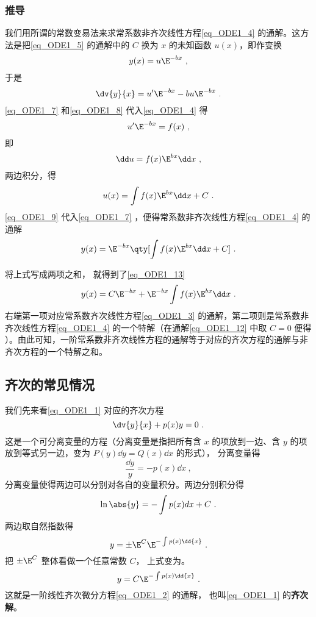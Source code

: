 \subsubsection{推导}
我们用所谓的常数变易法来求常系数非齐次线性方程\autoref{eq_ODE1_4} 的通解。这方法是把\autoref{eq_ODE1_5} 的通解中的 $C$ 换为 $x$ 的未知函数 $u(x)$，即作变换
\begin{equation}\label{eq_ODE1_7}
y(x)=u\E^{-bx}~,
\end{equation}
于是
\begin{equation}\label{eq_ODE1_8}
\dv{y}{x}=u'\E^{-bx}-bu\E^{-bx}~.
\end{equation}
\autoref{eq_ODE1_7} 和\autoref{eq_ODE1_8} 代入\autoref{eq_ODE1_4} 得
\begin{equation}
u'\E^{-bx}=f(x)~,
\end{equation}
即
\begin{equation}
\dd u=f(x)\E^{bx}\dd x~,
\end{equation}
两边积分，得
\begin{equation}\label{eq_ODE1_9}
u(x)=\int f(x)\E^{bx}\dd x+C~.
\end{equation}
\autoref{eq_ODE1_9} 代入\autoref{eq_ODE1_7} ，便得常系数非齐次线性方程\autoref{eq_ODE1_4} 的通解
\begin{equation}\label{eq_ODE1_12}
y(x)=\E^{-bx}\qty[\int f(x)\E^{bx}\dd x+C]~.
\end{equation}

将上式写成两项之和， 就得到了\autoref{eq_ODE1_13}
\begin{equation}
y(x)=C\E^{-bx}+\E^{-bx}\int f(x)\E^{bx}\dd x~.
\end{equation}
右端第一项对应常系数齐次线性方程\autoref{eq_ODE1_3} 的通解，第二项则是常系数非齐次线性方程\autoref{eq_ODE1_4} 的一个特解（在通解\autoref{eq_ODE1_12} 中取 $C=0$ 便得 ）。由此可知，一阶常系数非齐次线性方程的通解等于对应的齐次方程的通解与非齐次方程的一个特解之和。

\subsection{齐次的常见情况}
我们先来看\autoref{eq_ODE1_1} 对应的齐次方程
\begin{equation}\label{eq_ODE1_2}
\dv{y}{x} + p(x)y = 0~.
\end{equation}
这是一个可分离变量的方程（分离变量是指把所有含 $x$ 的项放到一边、含 $y$ 的项放到等式另一边，变为 $P(y) \dd y = Q(x) \dd x$ 的形式）， 分离变量得
\begin{equation}
\frac{\dd{y}}{y} = -p(x) \dd{x}~,
\end{equation}
分离变量使得两边可以分别对各自的变量积分。两边分别积分得
\begin{equation}
\ln\abs{y} = -\int p(x) dx + C~.
\end{equation}
两边取自然指数得
\begin{equation}
y = \pm \E^C \E^{-\int p(x) \dd{x}}~.
\end{equation}
把 $\pm \E^C $ 整体看做一个任意常数 $C$， 上式变为。
\begin{equation}\label{eq_ODE1_6}
y = C \E^{-\int p(x) \dd{x}}~.
\end{equation}
这就是一阶线性齐次微分方程\autoref{eq_ODE1_2} 的通解， 也叫\autoref{eq_ODE1_1} 的\textbf{齐次解}。

